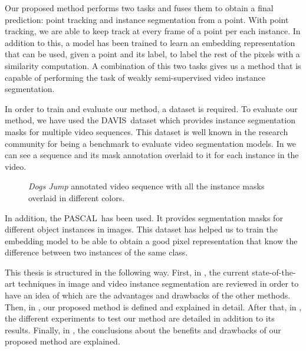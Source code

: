 Our proposed method performs two tasks and fuses them to obtain a final prediction: point tracking and instance segmentation from a point.
With point tracking, we are able to keep track at every frame of a point per each instance.
In addition to this, a model has been trained to learn an embedding representation that can be used, given a point and its label, to label the rest of the pixels with a similarity computation.
A combination of this two tasks gives us a method
that is capable of performing the task of weakly semi-supervised video instance segmentation.

In order to train and evaluate our method, a dataset is required.
To evaluate our method, we have used the DAVIS~\davisboth dataset which provides instance segmentation masks for multiple video sequences.
This dataset is well known in the research community for being a benchmark to evaluate video segmentation models.
In  we can see a sequence and its mask annotation overlaid to it for each instance in the video.

\begin{figure}[h]
  \centering
  \caption{\textit{Dogs Jump} annotated video sequence with all the instance masks overlaid in different colors. }
  \label{fig:intro:davis}
\end{figure}

In addition, the PASCAL~\pascal has been used. It provides segmentation masks for different object instances in images. This dataset has helped us to train the embedding model to be able to obtain a good pixel representation that know the difference between two instances of the same class.

This thesis is structured in the following way. First, in , the current state-of-the-art techniques in image and video instance segmentation are reviewed in order to have an idea of which are the advantages and drawbacks of the other methods.
Then, in , our proposed method is defined and explained in detail.
After that, in , the different experiments to test our method are detailed in addition to its results.
Finally, in , the conclusions about the benefits and drawbacks of our proposed method are explained.





